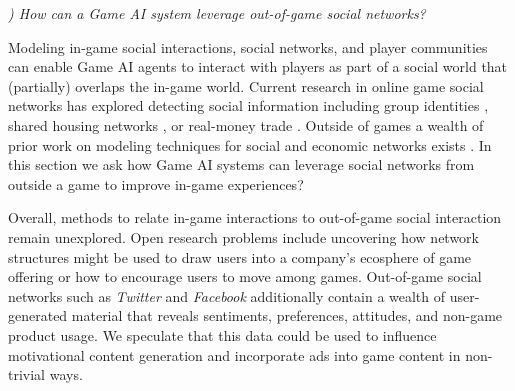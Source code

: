 \documentclass[conference]{IEEEtran}
\newcounter{questionno}
\newcommand{\subsubsectionx}[1]{{\em {\arabic{questionno}) #1}}
	\addtocounter{questionno}{1}
	}
\begin{document}


\subsubsectionx{How can a Game AI system leverage out-of-game social networks?}
%
Modeling in-game social interactions, social networks, and player communities can enable Game AI agents to interact with players as part of a social world that (partially) overlaps the in-game world. 
Current research in online game social networks has explored detecting social information including group identities \cite{grappiolo2013:group-identification}, shared housing networks \cite{ahmad2011:goldmining-hypergraph}, or real-money trade \cite{fujita2011:rmt-detect}. 
Outside of games a wealth of prior work on modeling techniques for social and economic networks exists \cite{jackson2010:soc-econ-networks}.
In this section we ask how Game AI systems can leverage social networks from outside a game to improve in-game experiences?

Overall, methods to relate in-game interactions to out-of-game social interaction remain unexplored.
Open research problems include uncovering how network structures might be used to draw users into a company's ecosphere of game offering or how to encourage users to move among games.
Out-of-game social networks such as {\em Twitter} and {\em Facebook} additionally contain a wealth of user-generated material that reveals sentiments, preferences, attitudes, and non-game product usage.
We speculate that this data could be used to influence motivational content generation and incorporate ads into game content in non-trivial ways.
%
\end{document}
